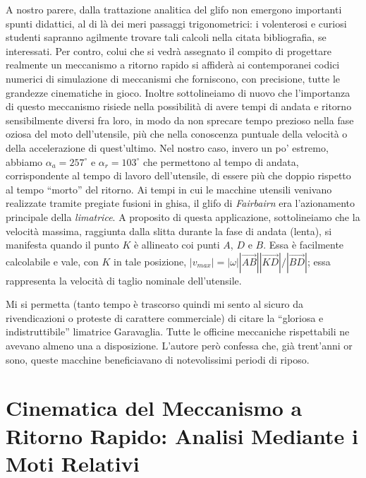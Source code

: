 \noindent A nostro parere, dalla trattazione analitica del glifo
non emergono importanti spunti didattici,
al di l\`a dei meri passaggi trigonometrici:
i volenterosi e curiosi studenti
sapranno agilmente trovare tali calcoli nella citata bibliografia, se
interessati.
Per contro, colui che si vedr\`a assegnato il compito di progettare realmente
un meccanismo a ritorno rapido si affider\`a ai contemporanei codici numerici
di simulazione di meccanismi che  forniscono, con precisione, tutte le
grandezze cinematiche in gioco.
Inoltre sottolineiamo di nuovo che
 l'importanza di questo meccanismo risiede nella 
possibilit\`a di avere tempi di andata e ritorno sensibilmente diversi fra
loro, in modo da non sprecare tempo prezioso nella fase
oziosa del moto dell'utensile,
pi\`u che nella conoscenza puntuale della velocit\`a o della
accelerazione di quest'ultimo.
Nel nostro caso, invero un po' estremo,  abbiamo $\alpha_a=257^{\circ}$ e $\alpha_r=103^{\circ}$ che permettono
al tempo di andata, corrispondente al tempo di lavoro dell'utensile, di essere
pi\`u che doppio rispetto al tempo ``morto'' del ritorno.
Ai tempi in cui le macchine utensili venivano realizzate tramite pregiate
fusioni in ghisa, il glifo di {\em Fairbairn} era l'azionamento
principale della {\em limatrice}.
A proposito di questa applicazione, sottolineiamo che
la velocit\`a massima, raggiunta dalla slitta durante
la fase di andata (lenta), si manifesta quando il punto
$K$ \`e allineato coi punti $A$, $D$ e $B$. Essa \`e facilmente calcolabile
e vale, con $K$ in tale
posizione, $|v_{max}|=|\omega| |\overrightarrow{AB}||\overrightarrow{KD}|/|\overrightarrow{BD}|$; essa
rappresenta la velocit\`a  di taglio nominale dell'utensile.

\noindent Mi si permetta (tanto  tempo \`e trascorso quindi mi sento al sicuro da
rivendicazioni o proteste di carattere commerciale) di citare la ``gloriosa
e indistruttibile'' limatrice
Garavaglia.
Tutte le officine meccaniche rispettabili
ne avevano almeno una a disposizione. L'autore per\`o confessa che, gi\`a
trent'anni or sono, queste macchine beneficiavano di
notevolissimi periodi di riposo.

\section{Cinematica del Meccanismo a Ritorno Rapido: Analisi 
Mediante i Moti Relativi}

